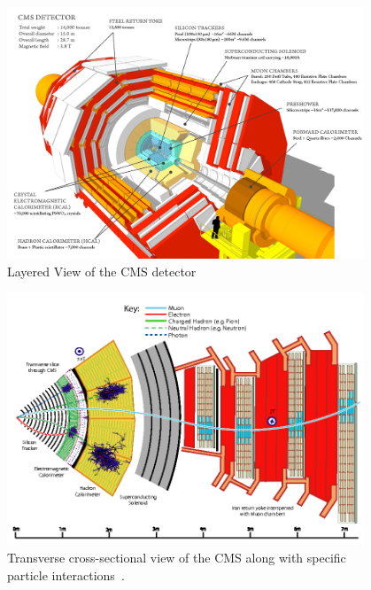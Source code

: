 \begin{figure}
\begin{center}
  \includegraphics[width=0.95\textwidth,keepaspectratio]{plots_and_figures/chapter3/cms_layered.png}
\caption{Layered View of the CMS detector}
\label{fig:cms_layered}
\end{center}
\end{figure}



\begin{figure}
\begin{center}
  \includegraphics[width=0.95\textwidth,keepaspectratio]{plots_and_figures/chapter3/cms_cross_sec.png}
\caption{Transverse cross-sectional view of the CMS along with specific particle interactions~\cite{Sirunyan:2017ulk}.}
\label{fig:cms_cross_sec}
\end{center}
\end{figure}




